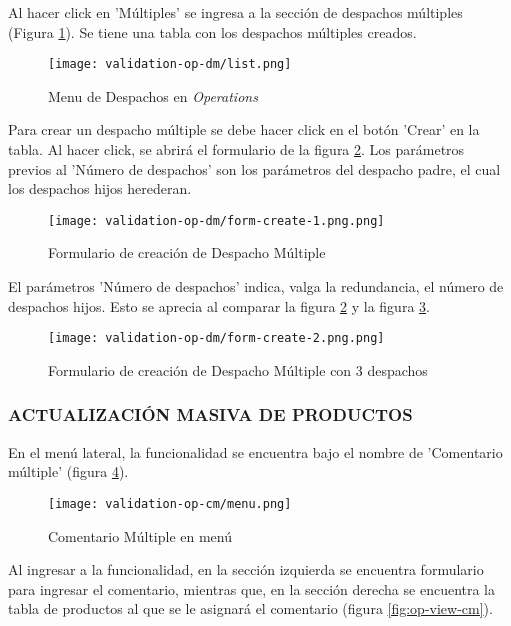 Al hacer click en 'Múltiples' se ingresa a la sección de despachos múltiples (Figura \ref{fig:op-list}).
Se tiene una tabla con los despachos múltiples creados.

\begin{figure}[H]
	\centering
	\texttt{[image: validation-op-dm/list.png]}
	\caption{\label{fig:op-list} Menu de Despachos en \textit{Operations}}
\end{figure}

Para crear un despacho múltiple se debe hacer click en el botón 'Crear' en la tabla. Al hacer click, se abrirá el formulario de la figura \ref{fig:op-form-create-1}.
Los parámetros previos al 'Número de despachos' son los parámetros del despacho padre, el cual los despachos hijos herederan.

\begin{figure}[H]
	\centering
	\texttt{[image: validation-op-dm/form-create-1.png.png]}
	\caption{\label{fig:op-form-create-1} Formulario de creación de Despacho Múltiple}
\end{figure}

El parámetros 'Número de despachos' indica, valga la redundancia, el número de despachos hijos. Esto se aprecia al comparar la figura \ref{fig:op-form-create-1} y la figura \ref{fig:op-form-create-2}.

\begin{figure}[H]
	\centering
	\texttt{[image: validation-op-dm/form-create-2.png.png]}
	\caption{\label{fig:op-form-create-2} Formulario de creación de Despacho Múltiple con 3 despachos}
\end{figure}

\subsubsection{ACTUALIZACIÓN MASIVA DE PRODUCTOS}

En el menú lateral, la funcionalidad se encuentra bajo el nombre de 'Comentario múltiple' (figura \ref{fig:op-menu-cm}).

\begin{figure}[H]
	\centering
	\texttt{[image: validation-op-cm/menu.png]}
	\caption{\label{fig:op-menu-cm} Comentario Múltiple en menú}
\end{figure}

Al ingresar a la funcionalidad, en la sección izquierda se encuentra formulario para ingresar el comentario, mientras que, en la sección derecha se encuentra la tabla de productos al que se le asignará el comentario (figura \ref{fig:op-view-cm}).

